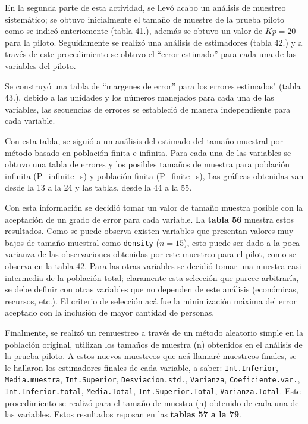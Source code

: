 \documentclass[
]{article}
\begin{document}
En la segunda parte de esta actividad, se llevó acabo un análisis de
muestreo sistemático; se obtuvo inicialmente el tamaño de muestre de la
prueba piloto como se indicó anteriomente (tabla 41.), además se obtuvo
un valor de \(Kp = 20\) para la piloto. Seguidamente se realizó una
análisis de estimadores (tabla 42.) y a través de este procedimiento se
obtuvo el ``error estimado'' para cada una de las variables del piloto.

Se construyó una tabla de ``margenes de error'' para los errores
estimados" (tabla 43.), debido a las unidades y los números manejados
para cada una de las variables, las secuencias de errores se estableció
de manera independiente para cada variable.

Con esta tabla, se siguió a un análisis del estimado del tamaño muestral
por método basado en población finita e infinita. Para cada una de las
variables se obtuvo una tabla de errores y los posibles tamaños de
muestra para población infinita (P\_infinite\_s) y población finita
(P\_finite\_s), Las gráficas obtenidas van desde la 13 a la 24 y las
tablas, desde la 44 a la 55.

Con esta información se decidió tomar un valor de tamaño muestra posible
con la aceptación de un grado de error para cada variable. La
\textbf{tabla 56} muestra estos resultados. Como se puede observa
existen variables que presentan valores muy bajos de tamaño muestral
como \texttt{density} (\(n = 15\)), esto puede ser dado a la poca
varianza de las observaciones obtenidas por este muestreo para el pilot,
como se observa en la tabla 42. Para las otras variables se decidió
tomar una muestra casi intermedia de la población total; claramente esta
selección que parece arbitraría, se debe definir con otras variables que
no dependen de este análisis (económicas, recursos, etc.). El criterio
de selección acá fue la minimización máxima del error aceptado con la
inclusión de mayor cantidad de personas.

Finalmente, se realizó un remuestreo a través de un método aleatorio
simple en la población original, utilizan los tamaños de muestra (n)
obtenidos en el análisis de la prueba piloto. A estos nuevos muestreos
que acá llamaré muestreos finales, se le hallaron los estimadores
finales de cada variable, a saber: \texttt{Int.Inferior},
\texttt{Media.muestra}, \texttt{Int.Superior}, \texttt{Desviacion.std.},
\texttt{Varianza}, \texttt{Coeficiente.var.},
\texttt{Int.Inferior.total}, \texttt{Media.Total},
\texttt{Int.Superior.Total}, \texttt{Varianza.Total}. Este procedimiento
se realizó para el tamaño de muestra (n) obtenido de cada una de las
variables. Estos resultados reposan en las \textbf{tablas 57 a la 79}.
\end{document}
